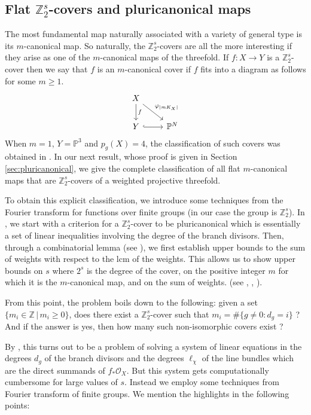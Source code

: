 \documentclass[12pt,twoside,]{amsart}
\theoremstyle{plain}
\theoremstyle{definition}
\begin{document}
\subsection{
Flat $\mathbb{Z}_2^s$-covers and pluricanonical maps}
The most fundamental map naturally associated with a variety of general type is its $m$-canonical map. So naturally, the $\mathbb{Z}_2^s$-covers are all the more interesting if they arise as one of the $m$-canonical maps of the threefold. If $f: X \to Y$ is a $\mathbb{Z}_2^s$-cover then we say that $f$ is an $m$-canonical cover if $f$ fits into a diagram as follows for some $m \geq 1$.
\[
\begin{tikzcd}
    X \arrow[d, "f"] \arrow[dr, "\varphi_{|mK_X|}"] & \\
    Y \arrow[r, hook] & \mathbb{P}^N
\end{tikzcd}
\]
When $m = 1$, $Y = \mathbb{P}^3$ and $p_g(X) = 4$, the classification of such covers was obtained in \cite{dugao16}. 
In our next result, whose proof is given in  Section \ref{sec:pluricanonical}, we give 
the complete classification of all flat $m$-canonical maps that are $\mathbb{Z}_2^s$-covers of a weighted projective threefold. 

To obtain this explicit classification, we introduce some techniques from the Fourier transform for functions over finite groups (in our case the group is $\mathbb{Z}_2^s$). In , we start with a criterion for a $\mathbb{Z}_2^s$-cover to be pluricanonical which is essentially a set of linear inequalities involving the degree of the branch divisors. Then, through a combinatorial lemma (see ), we first establish upper bounds to the sum of weights with respect to the lcm of the weights.
This allows us to show upper bounds on $s$ where $2^s$ is the degree of the cover, on the positive integer $m$ for which it is the $m$-canonical map, and on the sum of weights. (see , , ). \par

From this point, the problem boils down to the following: given a set $\{m_i \in \mathbb{Z} \, | \, m_i \geq 0 \}$, does there exist a $\mathbb{Z}_2^s$-cover such that $m_i=\#\{g \neq 0:d_g=i\}$ ? And if the answer is yes, then how many such non-isomorphic covers exist ? \par

By \cite{pardini1991abelian}, this turns out to be a problem of solving a system of linear equations in the degrees $d_g$ of the branch divisors and the degrees $\ell_{\chi}$ of the line bundles which are the direct summands of $f_*\mathcal{O}_X$. But this system gets computationally cumbersome for large values of $s$. Instead we employ some techniques from Fourier transform of finite groups. We mention the highlights in the following points:
\end{document}
